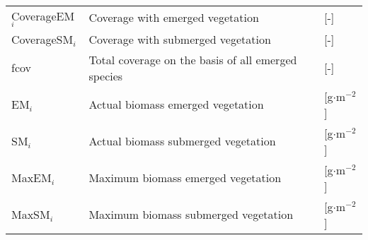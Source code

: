 \begin{tabular}{lll}
CoverageEM$_i$    & Coverage with emerged vegetation                       & [-]                 \\
CoverageSM$_i$    & Coverage with submerged vegetation                     & [-]                 \\
fcov              & Total coverage on the basis of all emerged species     & [-]                 \\
EM$_i$            & Actual biomass emerged vegetation                      & [g$\cdot$m$^{-2}$]  \\
SM$_i$            & Actual biomass submerged vegetation                    & [g$\cdot$m$^{-2}$]  \\
MaxEM$_i$         & Maximum biomass emerged vegetation                     & [g$\cdot$m$^{-2}$]  \\
MaxSM$_i$         & Maximum biomass submerged vegetation                   & [g$\cdot$m$^{-2}$]  \\
\end{tabular}
